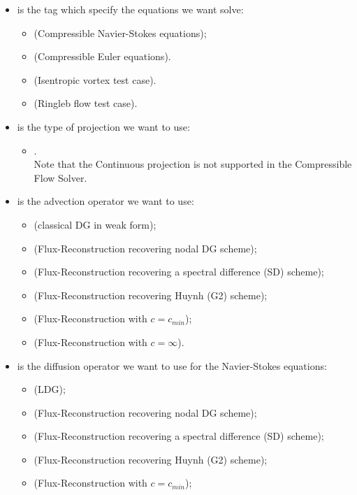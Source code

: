 \begin{itemize}
\item {} is the tag which specify the equations we want solve:
\begin{itemize}
\item {} (Compressible Navier-Stokes equations);
\item {} (Compressible Euler equations).
\item {} (Isentropic vortex test case).
\item {} (Ringleb flow test case).
\end{itemize}
\item {} is the type of projection we want to use:
\begin{itemize}
\item {}.\\
Note that the Continuous projection is not supported in the Compressible Flow Solver.
\end{itemize}
\item {} is the advection operator we want to use:
\begin{itemize}
\item {} (classical DG in weak form);
\item {} (Flux-Reconstruction recovering nodal DG scheme);
\item {} (Flux-Reconstruction recovering a spectral difference (SD) scheme);
\item {} (Flux-Reconstruction recovering Huynh (G2) scheme);
\item {} (Flux-Reconstruction with $c = c_{min}$);
\item {} (Flux-Reconstruction with $c = \infty$).
\end{itemize}
\item {} is the diffusion operator we want to use
for the Navier-Stokes equations:
\begin{itemize}
\item {} (LDG);
\item {} (Flux-Reconstruction recovering nodal DG scheme);
\item {} (Flux-Reconstruction recovering a spectral difference (SD) scheme);
\item {} (Flux-Reconstruction recovering Huynh (G2) scheme);
\item {} (Flux-Reconstruction with $c = c_{min}$);

\end{itemize}
\end{itemize}
